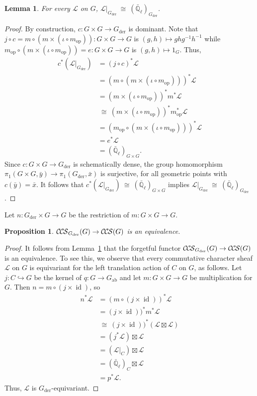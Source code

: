 \documentclass[10pt]{amsart}
\theoremstyle{plain}
\newtheorem{proposition}[theorem]{Proposition}
\newtheorem{lemma}[theorem]{Lemma}
\theoremstyle{definition}
\newcommand{\EE}{\mathbb{\bar Q}_\ell}
\DeclareMathOperator{\id}{id}
\newcommand{\op}{_{\operatorname{op}}}
\newcommand{\der}{_{\operatorname{der}}}
\newcommand{\ab}{_{\operatorname{ab}}}
\newcommand{\iso}{{\ \cong\ }}
\newcommand{\cs}[1]{{\mathcal{#1}}}
\newcommand{\CCS}{{\mathcal{C\hskip-.8pt C\hskip-0.8pt S}}}
\begin{document}
\begin{lemma}\label{lem:Lder}
For every $\cs{L}$ on $G$, $\cs{L}\vert_{G\der} \iso (\EE)_{G\der}$.
\end{lemma}

\begin{proof}
By construction, $c : G \times G \to G\der$ is dominant. 
Note that $j\circ c = m\circ (m \times (\iota\circ m\op)) : G \times G \to G$ is $(g,h) \mapsto gh g^{-1}h^{-1}$ while $m\op\circ (m \times (\iota\circ m\op))= e : G \times G \to G$ is $(g,h) \mapsto 1_G$. Thus,
\begin{align*}
c^* (\cs{L}\vert_{G\der})
&=  (j\circ c)^*\cs{L} \\
&= (m\circ (m \times (\iota\circ m\op)))^* \cs{L} \\
&= (m \times (\iota\circ m\op))^* m^* \cs{L} \\
&\iso (m \times (\iota\circ m\op))^* m\op^* \cs{L} \\
&= (m\op\circ (m \times (\iota\circ m\op)))^* \cs{L} \\
&= e^* \cs{L}\\
&= (\EE)_{G\times G}.
\end{align*}
Since $c : G \times G \to G\der$ is schematically dense, the group homomorphism $\pi_1(G\times G, {\bar y}) \to \pi_1(G\der, {\bar x})$ is surjective, for all geometric points with $c({\bar y}) = {\bar x}$.
 It follows that $c^* (\cs{L}\vert_{G\der}) \iso (\EE)_{G\times G}$ implies $\cs{L}\vert_{G\der} \iso (\EE)_{G\der}$. 
\end{proof}

Let $n : G\der \times G \to G$ be the restriction of $m: G\times G \to G$.


\begin{proposition}\label{prop:Gder-equivariance}
$\CCS_{G\der}(G) \to \CCS(G)$ is an equivalence.
\end{proposition}

\begin{proof}
It follows from Lemma~\ref{lem:Lder} that the forgetful functor $\CCS_{G\der}(G) \to \CCS(G)$ is an equivalence. To see this, we observe that
every commutative character sheaf $\cs{L}$ on $G$ is equivariant for the left translation action of $C$ on $G$, as follows.
Let $j : C \hookrightarrow G$ be the kernel of $q : G \to G\ab$ and let $m : G\times G \to G$ be multiplication for $G$. 
Then $n = m \circ (j \times \id)$, so
\begin{align*}
n^* \cs{L} 
&= (m \circ (j \times \id))^* \cs{L}\\
&= (j \times \id))^* m^*\cs{L}\\
&\iso (j \times \id))^* (\cs{L} \boxtimes \cs{L})\\
&= (j^*\cs{L}) \boxtimes \cs{L}\\
&= (\cs{L}\vert_C) \boxtimes \cs{L}\\
&= (\EE)_C \boxtimes \cs{L}\\
&= p^* \cs{L}.
\end{align*}
Thus, $\cs{L}$ is $G\der$-equivariant.
\end{proof}
\end{document}
